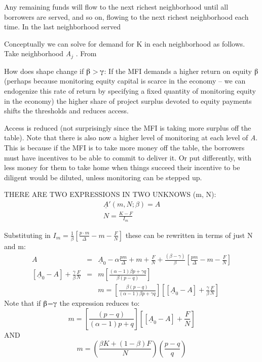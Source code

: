 \documentclass{article} %
\begin{document}
\noindent 

\noindent 

\noindent Any remaining funds will flow to the next richest neighborhood until all borrowers are served, and so on, flowing to the next richest neighborhood each time. In the last neighborhood served 

\noindent Conceptually we can solve for demand for K in each neighborhood as follows.  Take neighborhood \textit{A${}_{j}$} .  From 

\noindent 

\noindent 

\noindent How does shape change if $\mathrm{\betaup }$$\mathrm{>}$$\mathrm{\gammaup }$:  If the MFI demands a higher return on equity $\mathrm{\betaup }$ (perhaps because monitoring equity capital is scarce in the economy -- we can endogenize this rate of return by specifying a fixed quantity of monitoring equity in the economy) the higher share of project surplus devoted to equity payments shifts the thresholds and reduces access.  

\noindent 

\noindent 

\noindent Access is reduced (not surprisingly since the MFI is taking more surplus off the table).  Note that there is also now a higher level of monitoring at each level of \textit{A}.  This is because if the MFI is to take more money off the table, the borrowers must have incentives to be able to commit to deliver it. Or put differently, with less money for them to take home when things succeed their incentive to be diligent would be diluted, unless monitoring can be stepped up. 

\noindent 

\noindent THERE ARE TWO EXPRESSIONS IN TWO UNKNOWS (m, N):
\[\begin{array}{l} {\underline{A}'(m,N;\beta )=A} \\ {N=\frac{K-F}{I_{m} } } \end{array}\] 


\noindent Substituting in $I_{m} =\frac{1}{\beta } \left[\frac{p\cdot m}{\Delta } -m-\frac{F}{N} \right]$ these can be rewritten in terms of just N and m:
\[\begin{array}{rcl} {A} & {=} & {\underline{A}_{0} -\alpha \frac{pm}{\Delta } +m+\frac{F}{N} +\frac{(\beta -\gamma )}{\beta } \left[\frac{pm}{\Delta } -m-\frac{F}{N} \right]} \\ {\left[\underline{A}_{0} -A\right]+\frac{\gamma }{\beta } \frac{F}{N} } & {=} & {m\left[\frac{(\alpha -1)\beta p+\gamma q}{\beta (p-q)} \right]} \\ {} & {} & {\boxed{m=\left[\frac{\beta (p-q)}{(\alpha -1)\beta p+\gamma q} \right]\left[\left[\underline{A}_{0} -A\right]+\frac{\gamma }{\beta } \frac{F}{N} \right]} } \end{array}\] 
Note that if $\mathrm{\betaup }$=$\mathrm{\gammaup }$ the expression reduces to:
\[m=\left[\frac{(p-q)}{(\alpha -1)p+q} \right]\left[\left[\underline{A}_{0} -A\right]+\frac{F}{N} \right]\] 
AND 
\begin{equation} \label{1.15)} 
\boxed{m=\left(\frac{\beta K+(1-\beta )F}{N} \right)\left(\frac{p-q}{q} \right)}  
\end{equation} 
\end{document}
